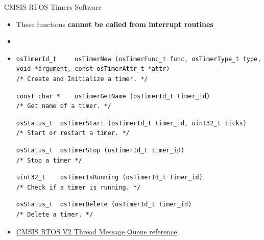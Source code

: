 \begin{frame}[fragile]{CMSIS RTOS Timers Software}
    \begin{itemize}
        \item These functions \textbf{cannot be called from interrupt routines}
        \item[]
        \item[]
         \begin{verbatim}
osTimerId_t 	osTimerNew (osTimerFunc_t func, osTimerType_t type, void *argument, const osTimerAttr_t *attr)
/* Create and Initialize a timer. */
         \end{verbatim}
         \begin{verbatim}
const char * 	osTimerGetName (osTimerId_t timer_id)
/* Get name of a timer. */
         \end{verbatim}
         \begin{verbatim}
osStatus_t 	osTimerStart (osTimerId_t timer_id, uint32_t ticks)
/* Start or restart a timer. */
         \end{verbatim}
         \begin{verbatim}
osStatus_t 	osTimerStop (osTimerId_t timer_id)
/* Stop a timer */
         \end{verbatim}
         \begin{verbatim}
uint32_t 	osTimerIsRunning (osTimerId_t timer_id)
/* Check if a timer is running. */
         \end{verbatim}
         \begin{verbatim}
osStatus_t 	osTimerDelete (osTimerId_t timer_id)
/* Delete a timer. */
         \end{verbatim}

         \item[] \href{https://arm-software.github.io/CMSIS_5/RTOS2/html/group__CMSIS__RTOS__TimerMgmt.html}{CMSIS RTOS V2 Thread Message Queue reference}
    \end{itemize}
\end{frame}

